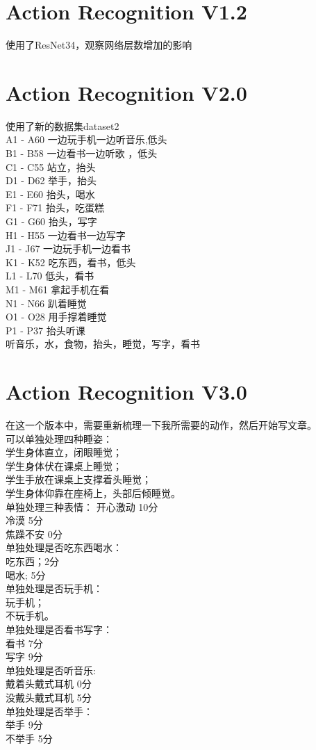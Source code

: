 \documentclass[]{article}
\begin{document}
\begin{CJK}{UTF8}{}
\section{Action Recognition V1.2}
使用了ResNet34，观察网络层数增加的影响

\section{Action Recognition V2.0}
使用了新的数据集dataset2\\
A1 - A60 一边玩手机一边听音乐,低头\\
B1 - B58  一边看书一边听歌 ，低头\\
C1 - C55 站立，抬头\\
D1 - D62 举手，抬头\\
E1 - E60 抬头，喝水\\
F1 - F71 抬头，吃蛋糕\\
G1 - G60 抬头，写字\\
H1 - H55 一边看书一边写字\\
J1 - J67 一边玩手机一边看书\\
K1 - K52 吃东西，看书，低头\\
L1 - L70 低头，看书\\
M1 - M61 拿起手机在看\\
N1 - N66 趴着睡觉\\
O1 - O28 用手撑着睡觉\\
P1 - P37 抬头听课\\   

听音乐，水，食物，抬头，睡觉，写字，看书
\section{Action Recognition V3.0}
在这一个版本中，需要重新梳理一下我所需要的动作，然后开始写文章。\\
可以单独处理四种睡姿：\\
学生身体直立，闭眼睡觉；\\
学生身体伏在课桌上睡觉；\\
学生手放在课桌上支撑着头睡觉；\\
学生身体仰靠在座椅上，头部后倾睡觉。\\
单独处理三种表情：
开心激动 10分\\
冷漠 5分\\
焦躁不安 0分\\
单独处理是否吃东西喝水：\\
吃东西；2分\\
喝水; 5分\\
单独处理是否玩手机：\\
玩手机；\\
不玩手机。\\
单独处理是否看书写字：\\
看书 7分\\
写字 9分\\
单独处理是否听音乐:\\
戴着头戴式耳机 0分\\
没戴头戴式耳机 5分\\
单独处理是否举手：\\
举手 9分\\
不举手 5分\\

\end{CJK}
\end{document}
